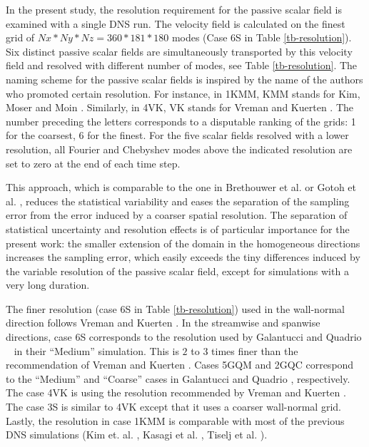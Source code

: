 \documentclass[review]{elsarticle}
\newcommand{\gqcite}{Galantucci and Quadrio \cite{galantucci2010very}}
\begin{document}
In the present study, the resolution requirement for the passive scalar field is examined with a single DNS run. The velocity field is calculated on the finest grid of $Nx*Ny*Nz = 360*181*180$ modes (Case 6S in Table \ref{tb-resolution}). Six distinct passive scalar fields are {\color{red}simultaneously} transported by this velocity field and resolved with different number of modes, see Table \ref{tb-resolution}. {\color{red} The naming scheme for the passive scalar fields is inspired by the name of the authors who promoted certain resolution. For instance, in 1KMM, KMM stands for Kim, Moser and Moin \cite{kim1987turbulence}. Similarly, in 4VK, VK stands for Vreman and Kuerten \citep{vreman2014comparison}. The number preceding the letters corresponds to a disputable ranking of the grids: 1 for the coarsest, 6 for the finest.} For the five scalar fields resolved with a lower resolution, all Fourier and Chebyshev modes above the indicated resolution are set to zero at the end of each time step.

This approach, {\color{red}which is comparable to the one in Brethouwer et al. \cite{brethouwer2003micro} or Gotoh et al. \cite{gotoh2012spectral}},  reduces the statistical variability and eases the separation of the sampling error from the error induced by a coarser spatial resolution. The separation of statistical uncertainty and resolution effects is of particular importance for the present work: the smaller extension of the domain in the homogeneous directions increases the sampling error, which easily exceeds the tiny differences induced by the variable resolution of the passive scalar field, except for simulations with a very long duration.

The finer resolution (case 6S in Table \ref{tb-resolution}) used in the wall-normal direction follows Vreman and Kuerten \cite{vreman2014comparison}. In the streamwise and spanwise directions, case 6S corresponds to the resolution used by \gqcite ~ in their ``Medium'' simulation. This is $2$ to $3$ times finer than the recommendation of Vreman and Kuerten \cite{vreman2014comparison}. Cases 5GQM and 2GQC correspond to the ``Medium'' and ``Coarse'' cases in \gqcite, respectively. The case 4VK is using the resolution recommended by Vreman and Kuerten \cite{vreman2014comparison}. The case 3S is similar to 4VK except that it uses a coarser wall-normal grid. Lastly, the resolution in case 1KMM is comparable with most of the previous DNS simulations (Kim et. al. \cite{kim1987turbulence}, Kasagi et al. \cite{kasagi1991direct}, Tiselj et al. \cite{tiselj2001effect}).
\end{document}
